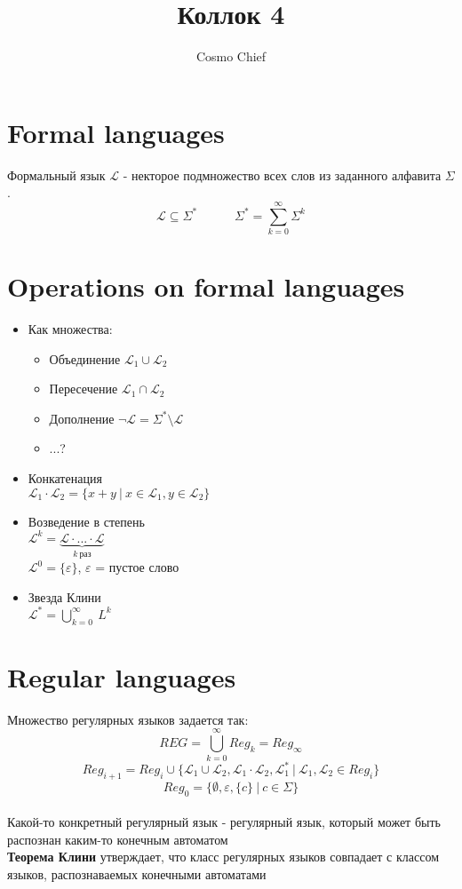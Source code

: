 \documentclass{article}
\title{Коллок 4}
\author[1]{Cosmo Chief}
\begin{document}
	\maketitle
	\tableofcontents
	\newpage
	\section{Formal languages}
	Формальный язык $\mathcal{L}$ - некторое подмножество всех слов из заданного алфавита $\Sigma$.\\
	\[
	\mathcal{L} \subseteq \Sigma^* \quad \quad \quad \Sigma^* = \sum_{k = 0}^{\infty} \Sigma^k
	\]
	
	\section{Operations on formal languages}
	\begin{itemize}
		\item
		Как множества:
		\begin{itemize}
		\item Объединение \(\mathcal{L}_1 \cup \mathcal{L}_2\)
		\item Пересечение \(\mathcal{L}_1 \cap \mathcal{L}_2\)
		\item Дополнение \(\neg \mathcal{L} = \Sigma^* \setminus \mathcal{L}\)
		\item ...?
		\end{itemize}
		\item
		Конкатенация\\
		\(\mathcal{L}_1 \cdot \mathcal{L}_2 = \{x + y \ | \ x \in \mathcal{L}_1, y \in \mathcal{L}_2\} \)
		\item
		Возведение в степень\\
		\(\mathcal{L}^k = \underbrace{\mathcal{L} \cdot ... \cdot \mathcal{L}}_{k \ \text{раз}} \)\\
		\(\mathcal{L}^0 = \{\varepsilon\}\), $\varepsilon$ = пустое слово
		\item
		Звезда Клини\\
		\(\mathcal{L}^* = \bigcup^{\infty}_{k = 0} \ L^k \)
	\end{itemize}
	
	\section{Regular languages}
	Множество регулярных языков задается так:\\
	\[
	REG = \bigcup^{\infty}_{k = 0} Reg_k = Reg_{\infty}\]
	\[
	Reg_{i+1} = Reg_{i} \cup \{\mathcal{L}_1 \cup \mathcal{L}_2, \mathcal{L}_1 \cdot \mathcal{L}_2, \mathcal{L}^{*}_{1} \ | \ \mathcal{L}_1, \mathcal{L}_2 \in Reg_i\}\]
	\[
	Reg_0 = \{\emptyset, \varepsilon, \{c\} \ | \ c \in \Sigma\}\]\\
	Какой-то конкретный регулярный язык - регулярный язык, который может быть распознан каким-то конечным автоматом\\
	\textbf{Теорема Клини} утверждает, что класс регулярных языков совпадает с классом языков, распознаваемых конечными автоматами
	
\end{document}
